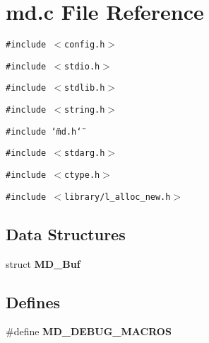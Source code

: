 \section{md.c File Reference}
\label{md_8c}
{\tt \#include $<$config.h$>$}\par
{\tt \#include $<$stdio.h$>$}\par
{\tt \#include $<$stdlib.h$>$}\par
{\tt \#include $<$string.h$>$}\par
{\tt \#include \char`\"{}md.h\char`\"{}}\par
{\tt \#include $<$stdarg.h$>$}\par
{\tt \#include $<$ctype.h$>$}\par
{\tt \#include $<$library/l\_\-alloc\_\-new.h$>$}\par
\subsection*{Data Structures}
\begin{CompactItemize}
\item 
struct \bf{MD\_\-Buf}
\end{CompactItemize}
\subsection*{Defines}
\begin{CompactItemize}
\item 
\#define \bf{MD\_\-DEBUG\_\-MACROS}
\end{CompactItemize}
